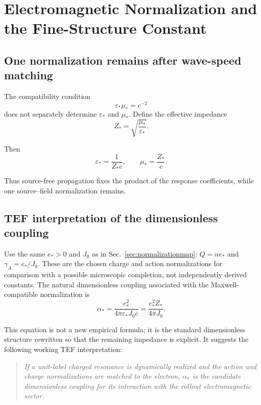 \documentclass[11pt]{article}
\begin{document}
\section{Electromagnetic Normalization and the Fine-Structure Constant}

\subsection{One normalization remains after wave-speed matching}

The compatibility condition
\begin{equation}
\varepsilon_*\mu_*=c^{-2}
\end{equation}
does not separately determine $\varepsilon_*$ and $\mu_*$. Define the effective impedance
\begin{equation}
\boxed{
Z_*
=
\sqrt{\frac{\mu_*}{\varepsilon_*}}.
}
\end{equation}

Then
\begin{equation}
\varepsilon_*
=
\frac{1}{Z_*c},
\qquad
\mu_*
=
\frac{Z_*}{c}.
\end{equation}

Thus source-free propagation fixes the product of the response coefficients, while one source--field normalization remains.

\subsection{TEF interpretation of the dimensionless coupling}

Use the same $e_*>0$ and $J_0$ as in Sec.~\ref{sec:normalizationmap}: $Q=n e_*$ and $\gamma_A=e_*/J_0$. These are the chosen charge and action normalizations for comparison with a possible microscopic completion, not independently derived constants. The natural dimensionless coupling associated with the Maxwell-compatible normalization is
\begin{equation}
\boxed{
\alpha_*
=
\frac{e_*^2}
{4\pi\varepsilon_*J_0c}
=
\frac{e_*^2Z_*}
{4\pi J_0}.
}
\end{equation}

This equation is not a new empirical formula; it is the standard dimensionless structure rewritten so that the remaining impedance is explicit. It suggests the following working TEF interpretation:

\begin{quote}
\emph{If a unit-label charged resonance is dynamically realized and the action and charge normalizations are matched to the electron, $\alpha_*$ is the candidate dimensionless coupling for its interaction with the rollout electromagnetic sector.}
\end{quote}
\end{document}
